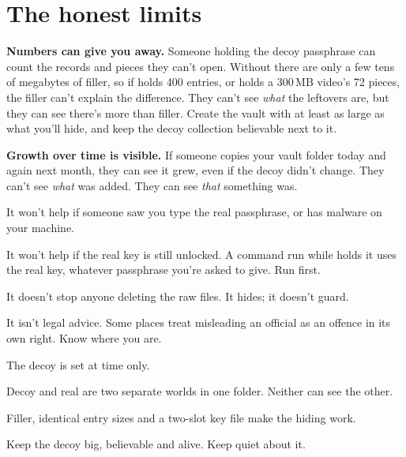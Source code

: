 \documentclass[10pt,oneside,openany]{book}
\begin{document}
\section{The honest limits}

\begin{headsup}
\textbf{Numbers can give you away.} Someone holding the decoy passphrase
can count the records and pieces they can't open. Without 
there are only a few tens of megabytes of filler, so if  holds
400 entries, or  holds a 300\,MB video's 72 pieces, the
filler can't explain the difference. They can't see \emph{what} the
leftovers are, but they can see there's more than filler. Create the vault
with  at least as large as what you'll hide, and keep the
decoy collection believable next to it.
\end{headsup}

\begin{headsup}
\textbf{Growth over time is visible.} If someone copies your vault folder
today and again next month, they can see it grew, even if the decoy didn't
change. They can't see \emph{what} was added. They can see \emph{that}
something was.
\end{headsup}

\begin{nopes}
  \item It won't help if someone saw you type the real passphrase, or has
        malware on your machine.
  \item It won't help if the real key is still unlocked. A command run
        while  holds it uses the real key, whatever
        passphrase you're asked to give. Run  first.
  \item It doesn't stop anyone deleting the raw files. It hides; it doesn't guard.
  \item It isn't legal advice. Some places treat misleading an official as an
        offence in its own right. Know where you are.
\end{nopes}

\begin{pocket}
\begin{pocketlist}
  \item The decoy is set at  time only.
  \item Decoy and real are two separate worlds in one folder. Neither can see the other.
  \item Filler, identical entry sizes and a two-slot key file make the hiding work.
  \item Keep the decoy big, believable and alive. Keep quiet about it.
\end{pocketlist}
\end{pocket}
\end{document}
